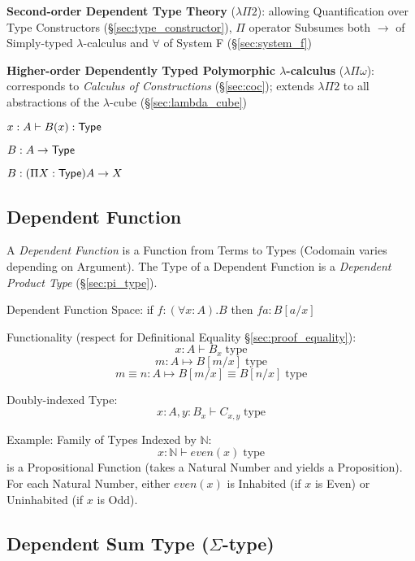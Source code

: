 \textbf{Second-order Dependent Type Theory} ($\lambda \Pi 2$):
allowing Quantification over Type Constructors
(\S\ref{sec:type_constructor}), $\Pi$ operator Subsumes both
$\rightarrow$ of Simply-typed $\lambda$-calculus and $\forall$ of
System F (\S\ref{sec:system_f})


\textbf{Higher-order Dependently Typed Polymorphic $\lambda$-calculus}
($\lambda \Pi \omega$): corresponds to \emph{Calculus of
  Constructions} (\S\ref{sec:coc}); extends $\lambda \Pi 2$ to all
abstractions of the $\lambda$-cube (\S\ref{sec:lambda_cube})


\asterism


$x:A \vdash B(x):\mathsf{Type}$

$B : A \rightarrow \mathsf{Type}$

$B : (\Pi X:\mathsf{Type}) A \rightarrow X$



\subsection{Dependent Function}\label{sec:dependent_function}

A \emph{Dependent Function} is a Function from Terms to Types
(Codomain varies depending on Argument). The Type of a Dependent
Function is a \emph{Dependent Product Type}
(\S\ref{sec:pi_type}).

Dependent Function Space: if $f:(\forall x: A).B$ then $f a : B[a/x]$

Functionality (respect for Definitional Equality
\S\ref{sec:proof_equality}):
\[
  x : A \vdash B_x \;\text{type}
\]\[
  m : A \mapsto B[m/x] \;\text{type}
\]\[
  m \equiv n : A \mapsto B[m/x] \equiv B[n/x] \;\text{type}
\]

Doubly-indexed Type:
\[
  x : A, y : B_x \vdash C_{x,y} \;\text{type}
\]

Example: Family of Types Indexed by $\mathbb{N}$:
\[
  x : \mathbb{N} \vdash even(x) \;\text{type}
\]
is a Propositional Function (takes a Natural Number and yields a
Proposition). For each Natural Number, either $even(x)$ is Inhabited
(if $x$ is Even) or Uninhabited (if $x$ is Odd).\cite{harper12}



\subsection{Dependent Sum Type ($\Sigma$-type)}\label{sec:sigma_type}


